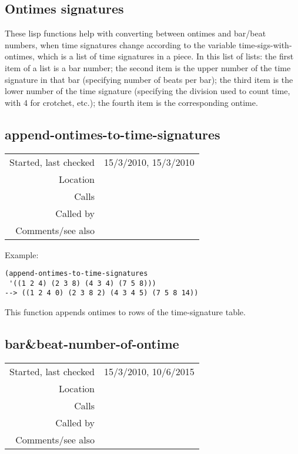\subsection{Ontimes signatures}\label{sec:ontimes-signatures}

These lisp functions help with converting between
ontimes and bar/beat numbers, when time signatures
change according to the variable time-sigs-with-
ontimes, which is a list of time signatures in a
piece. In this list of lists: the first item of a
list is a bar number; the second item is the upper
number of the time signature in that bar (specifying
number of beats per bar); the third item is the
lower number of the time signature (specifying the
division used to count time, with 4 for crotchet,
etc.); the fourth item is the corresponding
ontime.


\subsection*{append-ontimes-to-time-signatures}\label{fun:append-ontimes-to-time-signatures}

\vspace{0.3cm}
\begin{tabular}{r|p{8cm}}
Started, last checked & 15/3/2010, 15/3/2010 \\
Location & \nameref{sec:ontimes-signatures} \\
Calls & \nameref{fun:my-last} \\
Called by & \\
Comments/see also & \nameref{fun:kern-file2ontimes-signatures}
\end{tabular}

\vspace{0.5cm}
\noindent Example:
\begin{verbatim}
(append-ontimes-to-time-signatures
 '((1 2 4) (2 3 8) (4 3 4) (7 5 8)))
--> ((1 2 4 0) (2 3 8 2) (4 3 4 5) (7 5 8 14))
\end{verbatim}

\noindent This function appends ontimes to rows of
the time-signature table.


\subsection*{bar\&beat-number-of-ontime}\label{fun:bar-n-beat-number-of-ontime}

\vspace{0.3cm}
\begin{tabular}{r|p{8cm}}
Started, last checked & 15/3/2010, 10/6/2015 \\
Location & \nameref{sec:ontimes-signatures} \\
Calls & \nameref{fun:row-of-max-ontime<=ontime-arg} \\
Called by & \nameref{fun:bar-beat-ontimes} \\
Comments/see also & 
\end{tabular}

